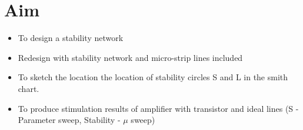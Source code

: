 
 \chapter*{ Aim }
\begin{itemize}
  \item To design a stability network
  \item Redesign with stability network and micro-strip lines included
  \item To sketch the location the location of stability circles S and L in the smith chart.
  \item To produce stimulation results of amplifier with transistor and ideal lines (S - Parameter sweep, Stability  - $\mu$ sweep)
\end{itemize}